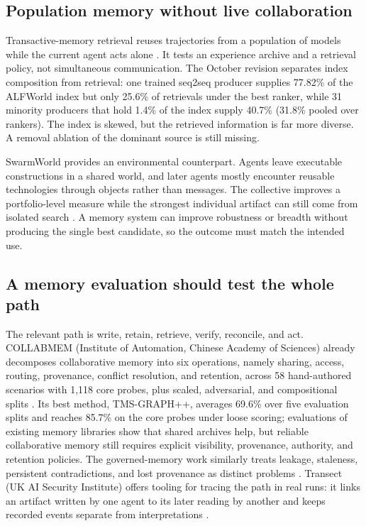 \subsection{Population memory without live collaboration}
Transactive-memory retrieval reuses trajectories from a population of models while the current agent acts alone \citep{multi-agent-transactive-memory}. It tests an experience archive and a retrieval policy, not simultaneous communication. The October revision separates index composition from retrieval: one trained seq2seq producer supplies 77.82\% of the ALFWorld index but only 25.6\% of retrievals under the best ranker, while 31 minority producers that hold 1.4\% of the index supply 40.7\% (31.8\% pooled over rankers). The index is skewed, but the retrieved information is far more diverse. A removal ablation of the dominant source is still missing.

SwarmWorld provides an environmental counterpart. Agents leave executable constructions in a shared world, and later agents mostly encounter reusable technologies through objects rather than messages. The collective improves a portfolio-level measure while the strongest individual artifact can still come from isolated search \citep{prev-swarmworld}. A memory system can improve robustness or breadth without producing the single best candidate, so the outcome must match the intended use.

\subsection{A memory evaluation should test the whole path}
The relevant path is write, retain, retrieve, verify, reconcile, and act. COLLABMEM (Institute of Automation, Chinese Academy of Sciences) already decomposes collaborative memory into six operations, namely sharing, access, routing, provenance, conflict resolution, and retention, across 58 hand-authored scenarios with 1,118 core probes, plus scaled, adversarial, and compositional splits \citep{collabmem-2026}. Its best method, TMS-GRAPH++, averages 69.6\% over five evaluation splits and reaches 85.7\% on the core probes under loose scoring; evaluations of existing memory libraries show that shared archives help, but reliable collaborative memory still requires explicit visibility, provenance, authority, and retention policies. The governed-memory work similarly treats leakage, staleness, persistent contradictions, and lost provenance as distinct problems \citep{governed-shared-memory}. Transect (UK AI Security Institute) offers tooling for tracing the path in real runs: it links an artifact written by one agent to its later reading by another and keeps recorded events separate from interpretations \citep{aisi-transect}.

